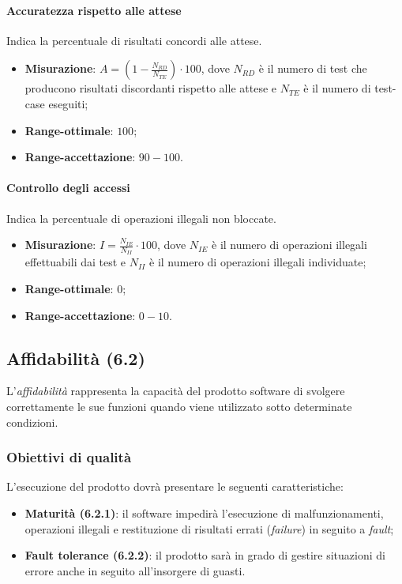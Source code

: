 \paragraph{Accuratezza rispetto alle attese}
Indica la percentuale di risultati concordi alle attese.
\begin{itemize}
\item \textbf{Misurazione}: $A=(1-\frac{N_{RD}}{N_{TE}}) \cdot 100$, dove $N_{RD}$ è il numero di test che producono risultati discordanti rispetto alle attese e $N_{TE}$ è il numero di test-case eseguiti;
\item \textbf{Range-ottimale}: $100$;
\item \textbf{Range-accettazione}: $90 - 100$.
\end{itemize}
\paragraph{Controllo degli accessi}
Indica la percentuale di operazioni illegali non bloccate.
\begin{itemize}
\item \textbf{Misurazione}: $I=\frac{N_{IE}}{N_{II}} \cdot 100$, dove $N_{IE}$ è il numero di operazioni illegali effettuabili dai test e $N_{II}$ è il numero di operazioni illegali individuate;
\item \textbf{Range-ottimale}: $0$;
\item \textbf{Range-accettazione}: $0 - 10$.
\end{itemize}


\subsection{Affidabilità (6.2)}
L'\textit{affidabilità} rappresenta la capacità del prodotto software di svolgere correttamente le sue funzioni quando viene utilizzato sotto determinate condizioni.
\subsubsection{Obiettivi di qualità}
L'esecuzione del prodotto dovrà presentare le seguenti caratteristiche:
\begin{itemize}
\item \textbf{Maturità (6.2.1)}: il software impedirà l'esecuzione di malfunzionamenti, operazioni illegali e restituzione di risultati errati (\textit{failure}) in seguito a \textit{fault};
\item \textbf{Fault tolerance (6.2.2)}: il prodotto sarà in grado di gestire situazioni di errore anche in seguito all'insorgere di guasti.
\end{itemize}
